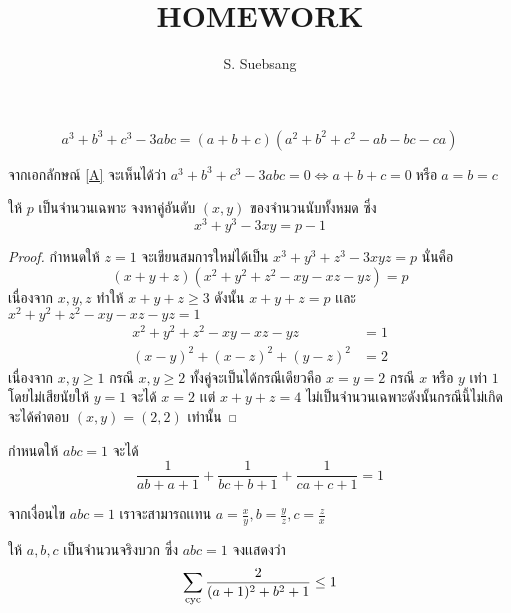 \documentclass[a4paper,12pt]{scrartcl}
\title{\textbf{HOMEWORK}}
\author{S. Suebsang}
\begin{document}
	
	\maketitle
	
	\begin{ID}
		
		\[ a^3 + b^3 + c^3 - 3abc = (a + b + c)(a^2 + b^2 + c^2 - ab - bc - ca)  \]
		\label{A}
		
	\end{ID}

จากเอกลักษณ์ \ref{A} จะเห็นได้ว่า $a^3 + b^3 + c^3 - 3abc = 0 \iff a + b + c = 0\; \textrm{หรือ} \; a = b = c$ 

\begin{example}
	
	ให้ $p$ เป็นจำนวนเฉพาะ จงหาคู่อันดับ $(x , y)$ ของจำนวนนับทั้งหมด ซึ่ง \[ x^3 + y^3 - 3xy = p - 1 \]
	
\end{example}

\begin{proof}
	
	กำหนดให้ $z = 1$ จะเขียนสมการใหม่ได้เป็น $x^3 + y^3 + z^3 - 3xyz = p$ นั่นคือ
		\[ (x + y + z)(x^2 + y^2 + z^2 - xy - xz - yz) = p\]
		เนื่องจาก $x , y , z$ ทำให้ $x + y + z \ge 3$ ดังนั้น $x + y + z = p$ เเละ $x^2 + y^2 + z^2 - xy - xz - yz = 1$
		\begin{align*}
			x^2 + y^2 + z^2 - xy - xz - yz &= 1 \\
			(x - y)^2 + (x - z)^2 + (y - z)^2 &= 2 
		\end{align*}
เนื่องจาก $x , y \ge 1$ กรณี $x ,y \ge 2$ ทั้งคู่จะเป็นได้กรณีเดียวคือ $x = y =2$ กรณี $x$ หรือ $y$ เท่า $1$ โดยไม่เสียนัยให้ $y = 1$ จะได้ $x = 2$ เเต่ $x + y + z = 4$ ไม่เป็นจำนวนเฉพาะดังนั้นกรณีนี้ไม่เกิดจะได้คำตอบ $(x , y) = (2 , 2)$ เท่านั้น   

\end{proof}

\begin{ID}
	กำหนดให้ $abc = 1$ จะได้
	\[  \frac{1}{ab+a+1} + \frac{1}{bc+b+1}  + \frac{1}{ca+c+1} = 1 \]
	\label{B}
\end{ID}

จากเงื่อนไข $abc = 1$ เราจะสามารถเเทน $ \textstyle a = \frac{x}{y}, b = \frac{y}{z}, c = \frac{z}{x}$

\begin{example}
	ให้ $a , b , c$ เป็นจำนวนจริงบวก ซึ่ง $abc = 1$ จงเเสดงว่า \[ \sum_{\mathrm{cyc}} \frac{2}{(a + 1)^2 + b^2 + 1} \le 1 \]
\end{example}
\end{document}
